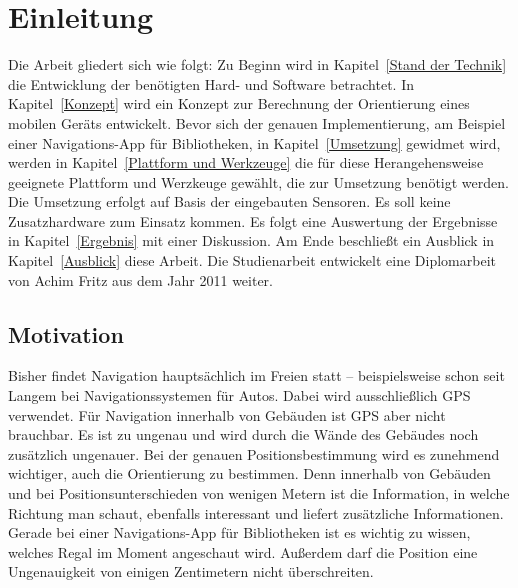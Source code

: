 
\chapter{Einleitung}\label{Einleitung}

\medskip
Die Arbeit gliedert sich wie folgt: Zu Beginn wird in Kapitel~\ref{Stand der Technik} die Entwicklung der benötigten Hard- und Software betrachtet. In Kapitel~\ref{Konzept} wird ein Konzept zur Berechnung der Orientierung eines mobilen Geräts entwickelt. Bevor sich der genauen Implementierung, am Beispiel einer Navigations-App für Bibliotheken, in Kapitel~\ref{Umsetzung} gewidmet wird, werden in Kapitel~\ref{Plattform und Werkzeuge} die für diese Herangehensweise geeignete Plattform und Werzkeuge gewählt, die zur Umsetzung benötigt werden. Die Umsetzung erfolgt auf Basis der eingebauten Sensoren. Es soll keine Zusatzhardware zum Einsatz kommen. Es folgt eine Auswertung der Ergebnisse in Kapitel~\ref{Ergebnis} mit einer Diskussion. Am Ende beschließt ein Ausblick in Kapitel~\ref{Ausblick} diese Arbeit. Die Studienarbeit entwickelt eine Diplomarbeit von Achim Fritz aus dem Jahr 2011 weiter.

\section{Motivation}\label{Motivation}
Bisher findet Navigation hauptsächlich im Freien statt – beispielsweise schon seit Langem bei Navigationssystemen für Autos. Dabei wird ausschließlich GPS verwendet. Für Navigation innerhalb von Gebäuden ist GPS aber nicht brauchbar. Es ist zu ungenau und wird durch die Wände des Gebäudes noch zusätzlich ungenauer. Bei der genauen Positionsbestimmung wird es zunehmend wichtiger, auch die Orientierung zu bestimmen. Denn innerhalb von Gebäuden und bei Positionsunterschieden von wenigen Metern ist die Information, in welche Richtung man schaut, ebenfalls interessant und liefert zusätzliche Informationen. Gerade bei einer Navigations-App für Bibliotheken ist es wichtig zu wissen, welches Regal im Moment angeschaut wird. Außerdem darf die Position eine Ungenauigkeit von einigen Zentimetern nicht überschreiten.